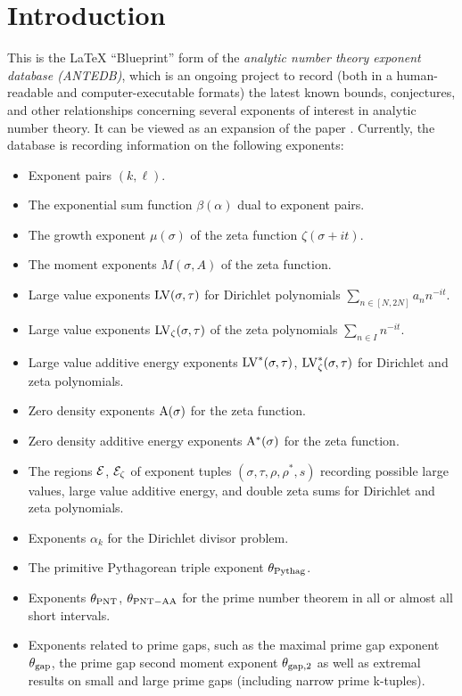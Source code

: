 \chapter{Introduction}\label{intro-chapter}

This is the LaTeX ``Blueprint'' form of the \emph{analytic number theory exponent database (ANTEDB)}, which is an ongoing project to record (both in a human-readable and computer-executable formats) the latest known bounds, conjectures, and other relationships concerning several exponents of interest in analytic number theory.  It can be viewed as an expansion of the paper \cite{trudgian-yang}. Currently, the database is recording information on the following exponents:

\begin{itemize}
\item Exponent pairs $(k,\ell)$.
\item The exponential sum function $\beta(\alpha)$ dual to exponent pairs.
\item The growth exponent $\mu(\sigma)$ of the zeta function $\zeta(\sigma+it)$.
\item The moment exponents $M(\sigma,A)$ of the zeta function.
\item Large value exponents $\mathrm{LV}(\sigma, \tau)$ for Dirichlet polynomials $\sum_{n \in [N,2N]} a_n n^{-it}$.
\item Large value exponents $\mathrm{LV}_\zeta(\sigma, \tau)$ of the zeta polynomials $\sum_{n \in I} n^{-it}$.
\item Large value additive energy exponents $\mathrm{LV}^*(\sigma, \tau)$, $\mathrm{LV}^*_\zeta(\sigma, \tau)$ for Dirichlet and zeta polynomials.
\item Zero density exponents $\mathrm{A}(\sigma)$ for the zeta function.
\item Zero density additive energy exponents $\mathrm{A}^*(\sigma)$ for the zeta function.
\item The regions $\mathcal{E}$, $\mathcal{E}_\zeta$ of exponent tuples $(\sigma,\tau,\rho,\rho^*,s)$ recording possible large values, large value additive energy, and double zeta sums for Dirichlet and zeta polynomials.
\item Exponents $\alpha_k$ for the Dirichlet divisor problem.
\item The primitive Pythagorean triple exponent $\theta_{\mathrm{Pythag}}$.
\item Exponents $\theta_{\mathrm{PNT}}$, $\theta_{\mathrm{PNT-AA}}$ for the prime number theorem in all or almost all short intervals.
\item Exponents related to prime gaps, such as the maximal prime gap exponent $\theta_{\mathrm{gap}}$, the prime gap second moment exponent $\theta_{\mathrm{gap},2}$ as well as extremal results on small and large prime gaps (including narrow prime k-tuples).

\end{itemize}
